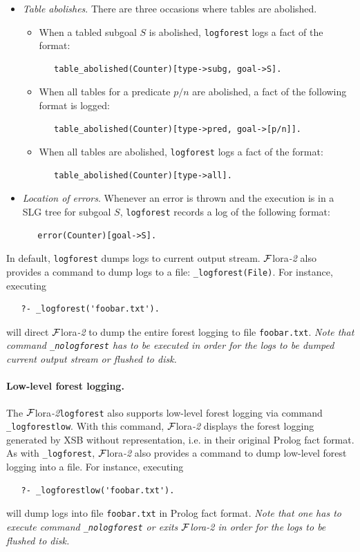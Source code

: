 \documentclass[11pt]{article}
\newcommand{\FLORA}{{\mbox{\sc ${\cal F}${lora}\rm\emph{-2}}}\xspace}
\begin{document}
\begin{itemize}
\item \emph{Table abolishes}. There are three occasions where tables are abolished.
  \begin{itemize}
  \item When a tabled subgoal $S$ is abolished, {\tt logforest} logs a fact of 
    the format:
\begin{verbatim}
   table_abolished(Counter)[type->subg, goal->S].
\end{verbatim}  
  \item When all tables for a predicate $p/n$ are abolished, a fact of the 
    following format is logged:
\begin{verbatim}
   table_abolished(Counter)[type->pred, goal->[p/n]].
\end{verbatim}  
  \item When all tables are abolished, {\tt logforest} logs a fact of 
    the format:
\begin{verbatim}
   table_abolished(Counter)[type->all].
\end{verbatim}  
  \end{itemize}

\item \emph{Location of errors}. Whenever an error is thrown and the execution
  is in a SLG tree for subgoal $S$, {\tt logforest} records a log of the following
  format:
\begin{verbatim}
   error(Counter)[goal->S].
\end{verbatim}  
\end{itemize}

In default, {\tt logforest} dumps logs to current output stream. \FLORA also
provides a command to dump logs to a file: {\tt \_logforest(File)}. For instance,
executing
\begin{verbatim}
   ?- _logforest('foobar.txt').
\end{verbatim}
will direct \FLORA to dump the entire forest logging to file {\tt foobar.txt}. 
\emph{Note that command {\tt \_nologforest} has to be executed in order for the
  logs to be dumped current output stream or flushed to disk.}

\paragraph{Low-level forest logging.}
The \FLORA  {\tt logforest} also supports low-level forest logging via command
{\tt \_logforestlow}. With this command, \FLORA displays the forest logging 
generated by XSB without representation, i.e. in their original Prolog fact
format. As with {\tt \_logforest}, \FLORA also provides a command to dump 
low-level forest logging into a file. For instance, executing
\begin{verbatim}
   ?- _logforestlow('foobar.txt').
\end{verbatim}
will dump logs into file {\tt foobar.txt} in Prolog fact format. 
\emph{Note that one has to execute command {\tt \_nologforest} or exits \FLORA
  in order for the logs to be flushed to disk.}
\end{document}
